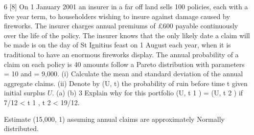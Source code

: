 \documentclass[a4paper,12pt]{article}
\begin{document}
\begin{enumerate}

6
[8]
On 1 January 2001 an insurer in a far off land sells 100 policies, each with a five year
term, to householders wishing to insure against damage caused by fireworks. The
insurer charges annual premiums of £600 payable continuously over the life of the
policy.
The insurer knows that the only likely date a claim will be made is on the day of
St Ignitius feast on 1 August each year, when it is traditional to have an enormous
fireworks display. The annual probability of a claim on each policy is 40%
amounts follow a Pareto distribution with parameters = 10 and = 9,000.
(i) Calculate the mean and standard deviation of the annual aggregate claims. 
(ii) Denote by (U, t) the probability of ruin before time t given initial surplus $U$.
(a)
(b)
3
Explain why for this portfolio (U, t 1 ) = (U, t 2 ) if
7/12 < t 1 , t 2 < 19/12.

Estimate (15,000, 1) assuming annual claims are approximately
Normally distributed.


\end{enumerate}
\end{document}
